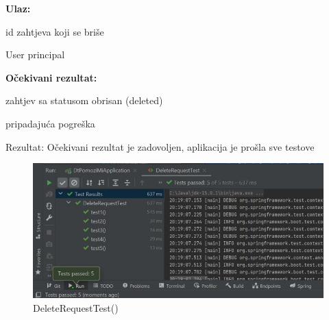 			\medskip
            \noindent\textbf{Ulaz:}
            \begin{packed_enum}
            \item id zahtjeva koji se briše
            \item User principal
            \end{packed_enum}
            
            \noindent\textbf{Očekivani rezultat:}
            \begin{packed_enum}
            \item zahtjev sa statusom obrisan (deleted)
            \item pripadajuća pogreška
            \end{packed_enum}
            
            \noindent \text
            Rezultat: Očekivani rezultat je zadovoljen, aplikacija je prošla sve testove \\
            
            \begin{figure}[H]
                 \includegraphics[width=\textwidth, height=\textheight, keepaspectratio]{slike/DeleteRequestTest.jpeg}
                \cntering
                \caption{DeleteRequestTest()}
            \end{figure}
            
